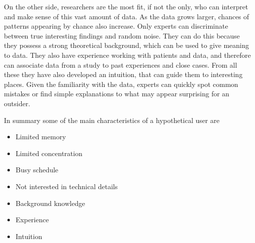 On the other side, researchers are the most fit, if not the only, who can interpret and make sense of this vast amount of data. As the data grows larger, chances of patterns appearing by chance also increase. Only experts can discriminate between true interesting findings and random noise. They can do this because they possess a strong theoretical background, which can be used to give meaning to data. They also have experience working with patients and data, and therefore can associate data from a study to past experiences and close cases. From all these they have also developed an intuition, that can guide them to interesting places. Given the familiarity with the data, experts can quickly spot common mistakes or find simple explanations to what may appear surprising for an outsider. 

In summary some of the main characteristics of a hypothetical user are

\begin{itemize}
\item Limited memory
\item Limited concentration
\item Busy schedule
\item Not interested in technical details
\item Background knowledge
\item Experience
\item Intuition
\end{itemize}




